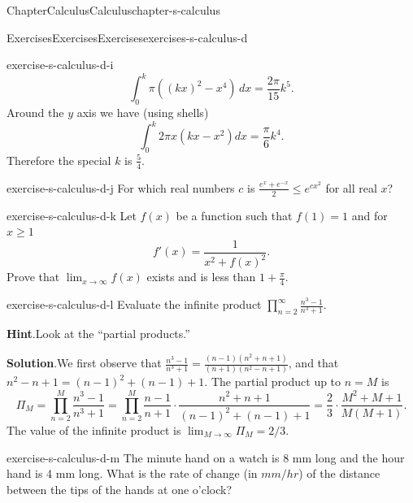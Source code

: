 \documentclass[oneside,10pt,]{book}
\newcommand{\blocktitlefont}{\relax}
\numberwithin{equation}{section}
\begin{document}
\begin{chapterptx}{Chapter}{Calculus}{}{Calculus}{}{}{chapter-s-calculus}
\begin{exercises-section}{Exercises}{Exercises}{}{Exercises}{}{}{exercises-s-calculus-d}
\begin{divisionexercise}{8}{}{}{exercise-s-calculus-d-i}
\begin{equation*}
\int_0^k \pi \left((k x)^2-x^4\right) \, dx=\frac{2\pi }{15}k^5\text{.}
\end{equation*}
Around the \(y\) axis we have (using shells)%
\begin{equation*}
\int _0^k2\pi  x\left(k x-x^2\right)dx=\frac{\pi }{6}k^4\text{.}
\end{equation*}
Therefore the special \(k\) is \(\frac{5}{4}\).%
\end{divisionexercise}%
\begin{divisionexercise}{9}{}{}{exercise-s-calculus-d-j}%
For which real numbers \(c\) is \(\frac{e^x+ e^{-x}}{2}\leq e^{c x^2}\) for all real \(x\)?%
\end{divisionexercise}%
\begin{divisionexercise}{10}{}{}{exercise-s-calculus-d-k}%
Let \(f(x)\) be a function such that \(f(1)=1\) and for \(x\geq 1\)%
\begin{equation*}
f'(x)=\frac{1}{x^2+ f(x)^2}\text{.}
\end{equation*}
Prove that \(\lim_{x\to \infty } f(x)\) exists and is less than \(1+\frac{\pi}{4}\).%
\end{divisionexercise}%
\begin{divisionexercise}{11}{}{}{exercise-s-calculus-d-l}%
Evaluate the infinite product \(\prod _{n=2}^{\infty } \frac{n^3-1}{n^3+1}\).%
\par\smallskip%
\noindent\textbf{\blocktitlefont Hint}.\hypertarget{hint-s-calculus-d-l-b}{}\quad{}Look at the ``partial products.''%
\par\smallskip%
\noindent\textbf{\blocktitlefont Solution}.\hypertarget{solution-s-calculus-d-l-c}{}\quad{}We first observe that \(\frac{n^3-1}{n^3+1} = \frac{(n-1)(n^2+n+1)}{(n+1)(n^2-n+1)}\), and that \(n^2-n+1 = (n-1)^2+(n-1)+1\).  The partial product up to \(n=M\) is%
\begin{equation*}
\Pi_M = \prod_{n=2}^M \frac{n^3-1}{n^3+1} = \prod_{n=2}^M \frac{n-1}{n+1}\cdot \frac{n^2+n+1}{(n-1)^2+(n-1)+1}= \frac{2}{3} \cdot \frac{M^2+M+1}{M(M+1)}.
\end{equation*}
The value of the infinite product is \(\lim_{M \rightarrow \infty} \Pi_M = 2/3\).%
\end{divisionexercise}%
\begin{divisionexercise}{12}{}{}{exercise-s-calculus-d-m}%
The minute hand on a watch is 8 mm long and the hour hand is 4 mm long. What is the rate of change (in \(mm/hr\)) of  the distance between the tips of the hands at one o’clock?%

\end{divisionexercise}
\end{exercises-section}
\end{chapterptx}
\end{document}
